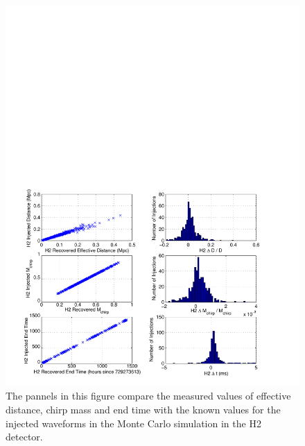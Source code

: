 \begin{figure}[p]
\begin{center}
\includegraphics[width=\textwidth]{figures/result/h2_param_error}
\end{center}
\caption[Measurement accuracy of H2 Injections Parameters]{%
\label{f:h2_param_error}%
The pannels in this figure compare the measured values of effective distance,
chirp mass and end time with the known values for the injected waveforms in
the Monte Carlo simulation in the H2 detector.
}
\end{figure}


